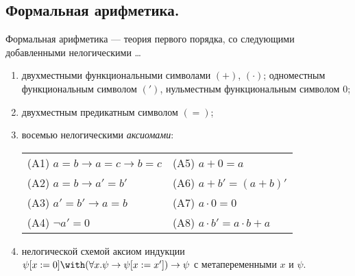 \documentclass[10pt,a4paper,oneside]{article}
\begin{document}
\subsection{Формальная арифметика.}
Формальная арифметика --- теория первого порядка, со следующими добавленными нелогическими \dots
\begin{enumerate}
\item двухместными функциональными символами $(+)$, $(\cdot)$; одноместным функциональным символом $(')$, 
нульместным функциональным символом $0$;
\item двухместным предикатным символом $(=)$;
\item восемью нелогическими \emph{аксиомами}:\vspace{0.1cm}
\begin{tabular}{ll}
(A1) $a=b \to a=c \to b=c$             &(A5) $a+0 = a$                     \\
(A2) $a=b \to a'=b'$                   &(A6) $a+b' = (a+b)'$               \\
(A3) $a'=b' \to a=b$                   &(A7) $a\cdot 0 = 0$                \\
(A4) $\neg a' = 0$                     &(A8) $a\cdot b' = a \cdot b + a$
\end{tabular}
\item нелогической схемой аксиом индукции $\psi[x:=0]\with(\forall x.\psi\to \psi[x:=x'])\to \psi$ с метапеременными $x$ и $\psi$.
\end{enumerate}
\end{document}
